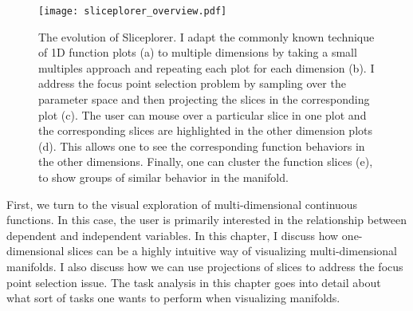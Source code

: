 
\begin{figure}
  \centering
  \texttt{[image: sliceplorer\_overview.pdf]}
  \caption{
    The evolution of Sliceplorer. I adapt the commonly known technique of
    1D function plots (a) to
    multiple dimensions by taking a small multiples approach and repeating each
    plot for each dimension (b). I address the
    focus point selection problem by sampling over the parameter space and then
    projecting the slices in the corresponding plot
    (c). The user can mouse over a particular
    slice in one plot and the corresponding slices are highlighted in the other
    dimension plots (d). This allows one to
    see the corresponding function behaviors in the other dimensions.  Finally,
    one can cluster the function slices (e), to
    show groups of similar behavior in the manifold.
  }
  \label{fig:walkthrough}
\end{figure}

First, we turn to the visual exploration of multi-dimensional continuous
functions. In this case, the user is primarily interested in the relationship
between dependent and independent variables. In this chapter, I discuss how
one-dimensional slices can be a highly intuitive way of visualizing
multi-dimensional manifolds. I also discuss how we can use projections of 
slices to address the focus point selection issue. The task analysis in this
chapter goes into detail about what sort of tasks one wants to perform when 
visualizing manifolds.











